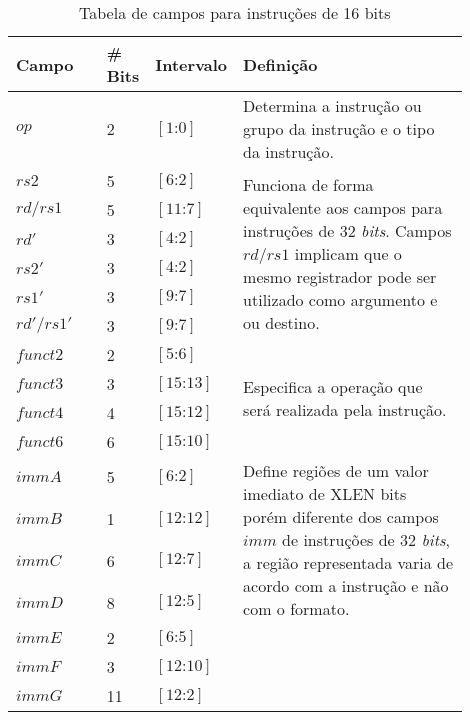   \begin{table}
    \begin{tabular}{ |p{0.2\linewidth}|p{0.08\linewidth}|p{0.12\linewidth}|p{0.5\linewidth}| } 
      \hline
      Campo & {\#} Bits & Intervalo & Definição \\ \hline \hline
      $op$ & 2 & $[1\text{:}0]$ & Determina a instrução ou grupo da instrução e o tipo da instrução. \\ \hline
      $rs2$ & 5 & $[6\text{:}2]$ & 
      \multirow{6}{1.0\linewidth}{Funciona de forma equivalente aos campos para instruções de 32 \emph{bits}. 
      Campos $rd$/$rs1$ implicam que o mesmo registrador pode ser utilizado como argumento e ou destino.}  \\
      $rd\text{/}rs1$ & 5 & $[11\text{:}7]$ & \\
      $rd'$ & 3 & $[4\text{:}2]$ & \\
      $rs2'$ & 3 & $[4\text{:}2]$ & \\
      $rs1'$ & 3 & $[9\text{:}7]$ & \\
      $rd'\text{/}rs1'$ & 3 & $[9\text{:}7]$ & \\ \hline
      $funct2$ & 2 & $[5\text{:}6]$ &  
      \multirow{4}{1.0\linewidth}{Especifica a operação que será realizada pela instrução.}\\
      $funct3$ & 3 & $[15\text{:}13]$ & \\
      $funct4$ & 4 & $[15\text{:}12]$ & \\
      $funct6$ & 6 & $[15\text{:}10]$ & \\ \hline
      $immA$ & 5 & $[6\text{:}2]$ & 
      \multirow{4}{1.0\linewidth}{Define regiões de um valor imediato de XLEN bits porém diferente dos campos $imm$ de
        instruções de 32 \emph{bits}, a região representada varia de acordo com a instrução
         e não com o formato.} \\ 
      $immB$ & 1 & $[12\text{:}12]$ & \\
      $immC$ & 6 & $[12\text{:}7]$ & \\
      $immD$ & 8 & $[12\text{:}5]$ & \\
      $immE$ & 2 & $[6\text{:}5]$ & \\
      $immF$ & 3 & $[12\text{:}10]$ & \\
      $immG$ & 11 & $[12\text{:}2]$ & \\ \hline
    \end{tabular}
  
    \caption{Tabela de campos para instruções de 16 bits \label{tab:if16}}
    \end{table}
  
